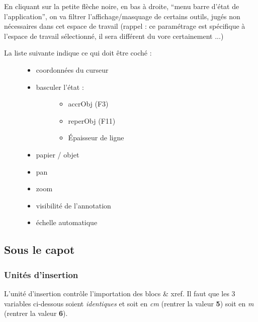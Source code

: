 \documentclass[a4paper,12pt,french]{sphinxmanual}
\begin{document}
En cliquant sur la petite flèche noire, en bas à droite, ``menu barre d'état de l'application'', on va filtrer l'affichage/masquage de certains outils, jugés non nécessaires dans cet espace de travail (rappel : ce paramétrage est spécifique à l'espace de travail sélectionné, il sera différent du vore certainement ...)
\begin{description}
\item[{La liste suivante indique ce qui doit être coché :}] \leavevmode\begin{itemize}
\item {} 
coordonnées du curseur

\item {} \begin{description}
\item[{basculer l'état :}] \leavevmode\begin{itemize}
\item {} 
accrObj (F3)

\item {} 
reperObj (F11)

\item {} 
Épaisseur de ligne

\end{itemize}

\end{description}

\item {} 
papier / objet

\item {} 
pan

\item {} 
zoom

\item {} 
visibilité de l'annotation

\item {} 
échelle automatique

\end{itemize}

\end{description}


\subsection{Sous le capot}
\label{acad/config_acad:sous-le-capot}

\subsubsection{Unités d'insertion}
\label{acad/config_acad:unites-d-insertion}
L'unité d'insertion contrôle l'importation des blocs \& xref. Il faut que les 3 variables ci-dessous soient \emph{identiques} et soit en \emph{cm} (rentrer la valeur \textbf{5}) soit en \emph{m} (rentrer la valeur \textbf{6}).
\end{document}
